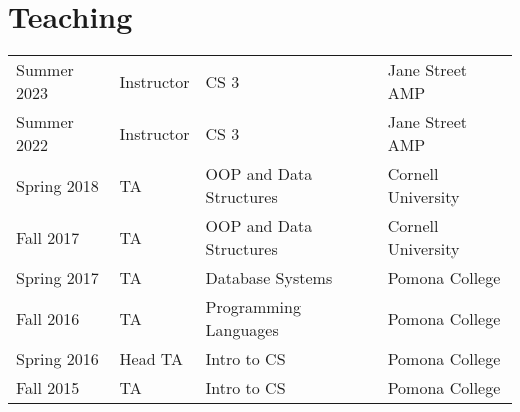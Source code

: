 \documentclass[]{deedy-resume-openfont}
\begin{document}
\begin{minipage}[t]{0.66\textwidth}







\section{Teaching} 

\begin{tabular}{llll}
  
    Summer 2023 & Instructor & CS 3 & Jane Street AMP \\
  
    Summer 2022 & Instructor & CS 3 & Jane Street AMP \\
  
    Spring 2018 & TA & OOP and Data Structures & Cornell University \\
  
    Fall 2017 & TA & OOP and Data Structures & Cornell University \\
  
    Spring 2017 & TA & Database Systems & Pomona College \\
  
    Fall 2016 & TA & Programming Languages & Pomona College \\
  
    Spring 2016 & Head TA & Intro to CS & Pomona College \\
  
    Fall 2015 & TA & Intro to CS & Pomona College \\
  
\end{tabular}


\sectionsep

\end{minipage} 
\end{document}
